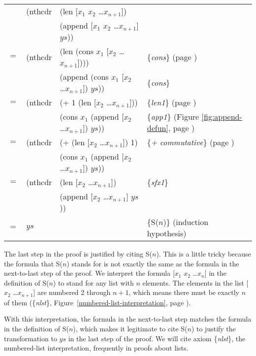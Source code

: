\begin{center}
\begin{tabular}{llll}
    & (nthcdr & (len [$x_1$ $x_2$ \dots $x_{n+1}$])                 & \\
    &         & (append [$x_1$ $x_2$ \dots $x_{n+1}$] $ys$))        & \\
$=$ & (nthcdr & (len (cons $x_1$ [$x_2$ \dots $x_{n+1}$])))         & \{\emph{cons}\} (page \pageref{first-rest-cons}) \\
    &         & (append (cons $x_1$ [$x_2$ \dots $x_{n+1}$]) $ys$)) & \{\emph{cons}\}                                \\
$=$ & (nthcdr & (+ 1 (len [$x_2$ \dots $x_{n+1}$]))                 & \{\emph{len1}\} (page \pageref{len-equations})       \\
    &         & (cons $x_1$ (append [$x_2$ \dots $x_{n+1}$]) $ys$)) & \{\emph{app1}\} (Figure \ref{fig:append-defun}, page \pageref{fig:append-defun})\\
$=$ & (nthcdr & (+ (len [$x_2$ \dots $x_{n+1}$]) 1)                 & \{\emph{+ commutative}\} (page \pageref{fig-02-01})  \\
    &         & (cons $x_1$ (append [$x_2$ \dots $x_{n+1}$]) $ys$)) &                                                      \\
$=$ & (nthcdr & (len [$x_2$ \dots $x_{n+1}$])                       & \{\emph{sfx1}\}                                      \\
    &         & (append [$x_2$ \dots $x_{n+1}$] $ys$))              &                                                      \\
$=$ & $ys$    &                                                     & \{S($n$)\} (induction hypothesis)\\
\end{tabular}
\end{center}

The last step in the proof is justified by citing S($n$).
This is a little tricky because the formula that S($n$)
stands for is not exactly the same as the formula in the next-to-last step of the proof.
We interpret the formula [$x_1$ $x_2$ \dots $x_n$] in the definition of S($n$)
to stand for any list with $n$ elements.
The elements in the list [$x_2$ \dots $x_{n+1}$] are numbered 2 through $n+1$,
which means there must be exactly $n$ of them
(\{\emph{nlst}\}, Figure~\ref{numbered-list-interpretation}, page \pageref{numbered-list-interpretation}).

With this interpretation, the formula in the next-to-last step
matches the formula in the definition of S($n$),
which makes it legitimate to cite S($n$) to justify
the transformation to $ys$ in the last step of the proof.
We will cite axiom \{\emph{nlst}\}, the numbered-list interpretation,
frequently in proofs about lists.

